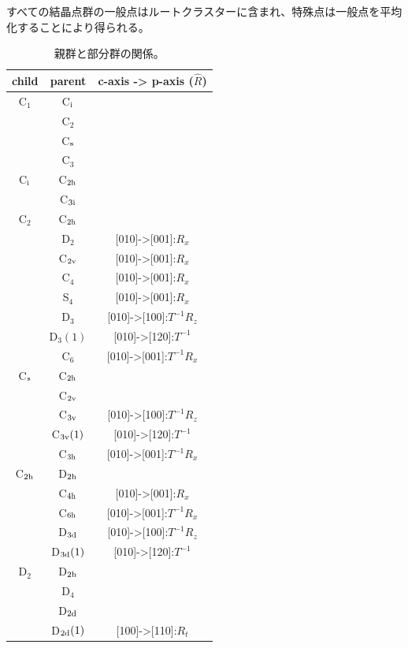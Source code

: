 \documentclass[11pt]{easymemo}
\begin{document}
すべての結晶点群の一般点はルートクラスターに含まれ、特殊点は一般点を平均化することにより得られる。


\begin{table}[t]
\caption{親群と部分群の関係。}
\label{tbl:1}
\begin{center}
\scriptsize
\begin{tabular}{ccc} \hline\hline
child & parent & c-axis -> p-axis ($\hat{R}$) \\ \hline
C$_1$ & C$_{\rm i}$ & \\
   & C$_2$ & \\
   & C$_{\rm s}$ & \\
   & C$_3$ & \\ \hline
C$_{\rm i}$ & C$_{\rm 2h}$ & \\
   & C$_{\rm 3i}$ & \\ \hline\hline
C$_2$ & C$_{\rm 2h}$ & \\
   & D$_2$ & [010]->[001]:$R_x$ \\
   & C$_{\rm 2v}$ & [010]->[001]:$R_x$ \\
   & C$_4$ & [010]->[001]:$R_x$ \\
   & S$_4$ & [010]->[001]:$R_x$ \\
   & D$_3$ & [010]->[100]:$T^{-1}R_z$ \\
   & D$_3(1)$ & [010]->[120]:$T^{-1}$ \\
   & C$_6$ & [010]->[001]:$T^{-1}R_x$ \\ \hline
C$_{\rm s}$ & C$_{\rm 2h}$ & \\
   & C$_{\rm 2v}$ & \\
   & C$_{\rm 3v}$ & [010]->[100]:$T^{-1}R_z$ \\
   & C$_{\rm 3v}(1)$ & [010]->[120]:$T^{-1}$ \\
   & C$_{\rm 3h}$ & [010]->[001]:$T^{-1}R_x$ \\ \hline
C$_{\rm 2h}$ & D$_{\rm 2h}$ & \\
   & C$_{\rm 4h}$ & [010]->[001]:$R_x$ \\
   & C$_{\rm 6h}$ & [010]->[001]:$T^{-1}R_x$ \\
   & D$_{\rm 3d}$ & [010]->[100]:$T^{-1}R_z$ \\
   & D$_{\rm 3d}(1)$ & [010]->[120]:$T^{-1}$ \\ \hline\hline
D$_2$ & D$_{\rm 2h}$ & \\
   & D$_4$ & \\
   & D$_{\rm 2d}$ & \\
   & D$_{\rm 2d}(1)$ & [100]->[110]:$R_t$ \\

\end{tabular}
\end{center}
\end{table}
\end{document}
